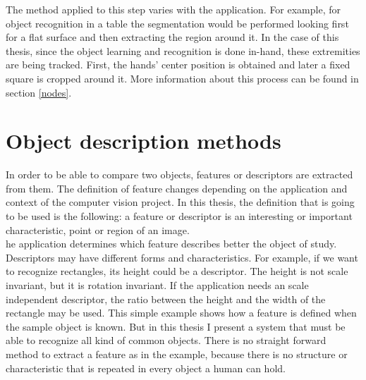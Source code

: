 The method applied to this step varies with the application. 
For example, for object recognition in a table the segmentation would be performed looking first for a flat surface and then extracting the region around it. 
In the case of this thesis, since the object learning and recognition is done in-hand, these extremities are being tracked. 
First, the hands' center position is obtained and later a fixed square is cropped around it. 
More information about this process can be found in section \ref{nodes}.



\section{Object description methods}
\label{descriptors}
In order to be able to compare two objects, features or descriptors are extracted from them. 
The definition of feature changes depending on the application and context of the computer vision project. In this thesis, the definition that is going to be used is the following:
a feature or descriptor is an interesting or important characteristic, point or region of an image. 
\\

he application determines which feature describes better the object of study. 
Descriptors may have different forms and characteristics. 
For example, if we want to recognize rectangles, its height could be a descriptor.
The height is not scale invariant, but it is rotation invariant. 
If the application needs an scale independent descriptor, the ratio between the height and the width of the rectangle may be used. 
This simple example shows how a feature is defined when the sample object is known. 
But in this thesis I present a system that must be able to recognize all kind of common objects. 
There is no straight forward method to extract a feature as in the example, because there is no structure or characteristic that is repeated in every object a human can hold. 
\\

